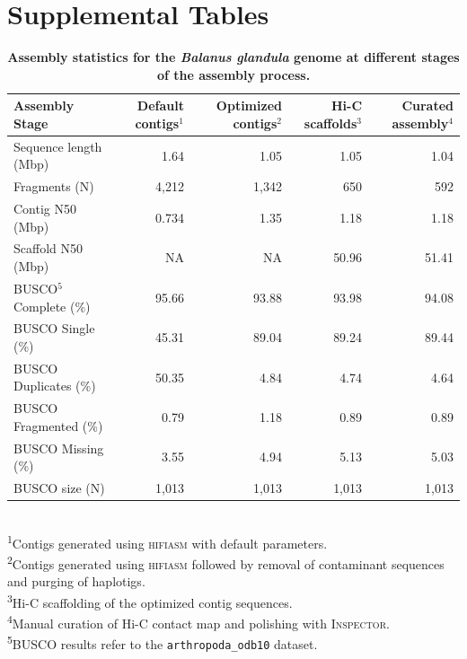 \documentclass[11pt]{article}
\newcounter{suptable}
\newcommand{\suptablecaption}[1]{%
    \addtocounter{table}{-1}%
    \refstepcounter{suptable}%
    \renewcommand{\thetable}{S\arabic{suptable}}%
    \caption{#1}%
    \addtocounter{table}{1}%
    \renewcommand{\thetable}{\arabic{table}}%
}
\newcommand{\balgla}{\textit{Balanus glandula}\xspace}
\begin{document}
\pagebreak

\section*{Supplemental Tables}

\begin{table}[ht]
    \centering
    \suptablecaption{\textbf{Assembly statistics for the \balgla{} genome
        at different stages of the assembly process.}}
    \begin{tabular}{lrrrr}
        \toprule
        Assembly Stage &
            \shortstack{Default \\ contigs$^1$} &
            \shortstack{Optimized \\ contigs$^2$} &
            \shortstack{Hi-C \\ scaffolds$^3$} &
            \shortstack{Curated \\ assembly$^4$} \\
        \midrule
        Sequence length (Mbp)            & 1.64  & 1.05  & 1.05  & 1.04  \\
        Fragments (N)                    & 4,212 & 1,342 & 650   & 592   \\
        Contig N50 (Mbp)                 & 0.734 & 1.35  & 1.18  & 1.18  \\
        Scaffold N50 (Mbp)               & NA    & NA    & 50.96 & 51.41 \\
        \textsc{BUSCO}$^5$ Complete (\%) & 95.66 & 93.88 & 93.98 & 94.08 \\
        \textsc{BUSCO} Single (\%)       & 45.31 & 89.04 & 89.24 & 89.44 \\
        \textsc{BUSCO} Duplicates (\%)   & 50.35 & 4.84  & 4.74  & 4.64  \\
        \textsc{BUSCO} Fragmented (\%)   & 0.79  & 1.18  & 0.89  & 0.89  \\
        \textsc{BUSCO} Missing (\%)      & 3.55  & 4.94  & 5.13  & 5.03  \\
        \textsc{BUSCO} size (N)          & 1,013 & 1,013 & 1,013 & 1,013 \\
        \bottomrule
    \end{tabular}
    \label{tab:sup_asm_stats}
\footnotesize
\\
\textsuperscript{1}Contigs generated using \textsc{hifiasm} with default parameters. \\
\textsuperscript{2}Contigs generated using \textsc{hifiasm} followed by removal of
    contaminant sequences and purging of haplotigs. \\
\textsuperscript{3}Hi-C scaffolding of the optimized contig sequences. \\
\textsuperscript{4}Manual curation of Hi-C contact map and polishing with
    \textsc{Inspector.} \\
\textsuperscript{5}\textsc{BUSCO} results refer to the \texttt{arthropoda\_odb10}
    dataset.\\
\end{table}
\end{document}
